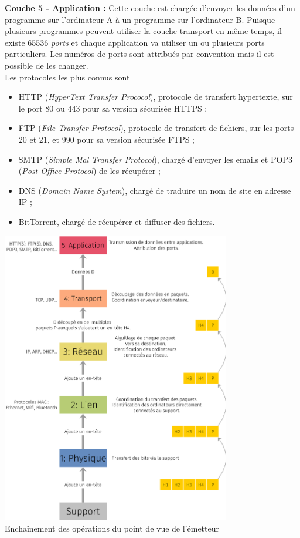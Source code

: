 	\textbf{Couche 5 - Application :} Cette couche est chargée d'envoyer les données d'un programme sur l'ordinateur A à un programme sur l'ordinateur B. Puisque plusieurs programmes peuvent utiliser la couche transport en même temps, il existe 65536 \textit{ports} et chaque application va utiliser un ou plusieurs ports particuliers. Les numéros de ports sont attribués par convention mais il est possible de les changer.\\
          Les protocoles les plus connus sont
          \begin{itemize}
              \item 	HTTP (\textit{HyperText Transfer Prococol}), protocole de transfert hypertexte, sur le port 80 ou 443 pour sa version sécurisée HTTPS ;
              \item 	FTP (\textit{File Transfer Protocol}), protocole de transfert de fichiers, sur les ports 20 et 21, et 990 pour sa version sécurisée FTPS ;
              \item 	SMTP (\textit{Simple Mal Transfer Protocol}), chargé d'envoyer les emails et POP3 (\textit{Post Office Protocol}) de les récupérer ;
              \item 	DNS (\textit{Domain Name System}), chargé de traduire un nom de site en adresse IP ;
              \item 	BitTorrent, chargé de récupérer et diffuser des fichiers.
          \end{itemize}

          \begin{center}
            \includegraphics[width=10cm]{ch-reseaux/img/modele_5_couches_up.png}\\
        
            \footnotesize{Enchaînement des opérations du point de vue de l'émetteur}
        \end{center}

